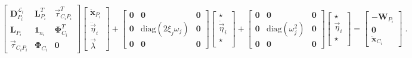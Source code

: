 \begin{small}
\begin{equation}\label{eq:2nda}
\left[\begin{array}{ccc}\mathbf{D}^{\mathcal{L}_i}_{P_i} & \mathbf{L}_{P_i}^T & \vec{\tau}_{C_iP_i}^T \\ \mathbf{L}_{P_i} & \mathbf{1}_{n_i} & \mathbf{\Phi}_{C_i}^T \\
\vec{\tau}_{C_iP_i} & \mathbf{\Phi}_{C_i} & \mathbf{0}\end{array}\right]\left[\begin{array}{c}\ddot{\mathbf{x}}_{P_i}\\ \ddot{\vec{\eta}}_i\\\vec{\lambda}\end{array}\right]+\left[\begin{array}{ccc} \mathbf{0}& \mathbf{0}& \mathbf{0} \\  \mathbf{0} & \mbox{diag}(2\xi_j\omega_j)& \mathbf{0} \\\mathbf{0}& \mathbf{0}& \mathbf{0}\end{array}\right]\left[\begin{array}{c}\star \\ \dot{\vec{\eta}}_i \\ \star \\\end{array}\right]+\left[\begin{array}{ccc} \mathbf{0}& \mathbf{0}& \mathbf{0}\\  \mathbf{0}& \mbox{diag}(\omega_j^2)& \mathbf{0} \\\mathbf{0}& \mathbf{0}& \mathbf{0}\end{array}\right]\left[\begin{array}{c} \star \\ \vec{\eta}_i \\ \star\\ \end{array}\right]=\left[\begin{array}{c}-\mathbf{W}_{P_i} \\ \mathbf{0} \\ \ddot{\mathbf{x}}_{C_i}\end{array}\right]\;.
\end{equation}
\end{small}
